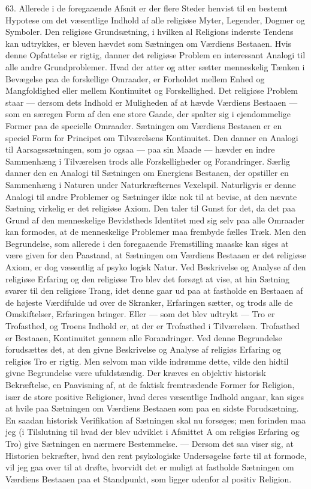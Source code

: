 \documentclass[12pt,a4paper,openany]{book}
\newcommand{\opage}[1]{\marginnote{\footnotesize\textit{[#1]}}}
\begin{document}
63. Allerede i de foregaaende Afsnit er der flere Steder henvist til en
bestemt Hypotese om det væsentlige Indhold af alle religiøse Myter,
Legender, Dogmer og Symboler. Den religiøse Grundsætning, i hvilken al
Religions inderste Tendens kan udtrykkes, er bleven hævdet som Sætningen
om Værdiens Bestaaen. Hvis denne Opfattelse er rigtig, danner det
religiøse Problem en interessant Analogi til alle andre Grundproblemer.
Hvad der atter og atter sætter menneskelig Tænken i Bevægelse paa de
forskellige Omraader, er Forholdet mellem Enhed og Mangfoldighed eller
mellem Kontinuitet og Forskellighed. Det religiøse Problem staar ---
dersom dets Indhold er Muligheden af at hævde Værdiens Bestaaen --- som
en særegen Form af den ene store Gaade, der spalter sig i ejendommelige
Former paa de specielle Omraader. Sætningen om Værdiens Bestaaen er en
speciel Form for Principet om Tilværelsens Kontinuitet. Den danner en
Analogi til Aarsagssætningen, som jo ogsaa --- paa sin Maade --- hævder
en indre Sammenhæng i Tilværelsen trods alle Forskelligheder og
Forandringer. Særlig danner den en Analogi til Sætningen om Energiens
Bestaaen, der opstiller en Sammenhæng i Naturen under Naturkræfternes
Vexelspil. Naturligvis er denne Analogi til andre Problemer og Sætninger
ikke nok til at bevise, at den nævnte Sætning virkelig er det religiøse
Axiom. Den taler til Gunst for det, da det paa Grund af den menneskelige
Bevidstheds Identitet med sig selv paa alle Omraader kan formodes, at de
menneskelige Problemer maa frembyde fælles Træk. Men den Begrundelse,
som allerede i den foregaaende Fremstilling maaske kan siges at være
given for den Paastand, at Sætningen om Værdiens Bestaaen er det
religiøse Axiom, er dog væsentlig af psyko%
\opage{146}logisk Natur. Ved Beskrivelse og Analyse af den religiøse
Erfaring og den religiøse Tro blev det forsøgt at vise, at hin Sætning
svarer til den religiøse Trang, idet denne gaar ud paa at fastholde en
Bestaaen af de højeste Værdifulde ud over de Skranker, Erfaringen
sætter, og trods alle de Omskiftelser, Erfaringen bringer. Eller --- som
det blev udtrykt --- Tro er Trofasthed, og Troens Indhold er, at der er
Trofasthed i Tilværelsen. Trofasthed er Bestaaen, Kontinuitet gennem
alle Forandringer. Ved denne Begrundelse forudsættes det, at den givne
Beskrivelse og Analyse af religiøs Erfaring og religiøs Tro er rigtig.
Men selvom man vilde indrømme dette, vilde den hidtil givne Begrundelse
være ufuldstændig. Der kræves en objektiv historisk Bekræftelse, en
Paavisning af, at de faktisk fremtrædende Former for Religion, især de
store positive Religioner, hvad deres væsentlige Indhold angaar, kan
siges at hvile paa Sætningen om Værdiens Bestaaen som paa en sidste
Forudsætning. En saadan historisk Verifikation af Sætningen skal nu
forsøges; men forinden maa jeg (i Tilslutning til hvad der blev udviklet
i Afsnittet A om religiøs Erfaring og Tro) give Sætningen en nærmere
Bestemmelse. --- Dersom det saa viser sig, at Historien bekræfter, hvad
den rent psykologiske Undersøgelse førte til at formode, vil jeg gaa
over til at drøfte, hvorvidt det er muligt at fastholde Sætningen om
Værdiens Bestaaen paa et Standpunkt, som ligger udenfor al positiv
Religion.
\end{document}
